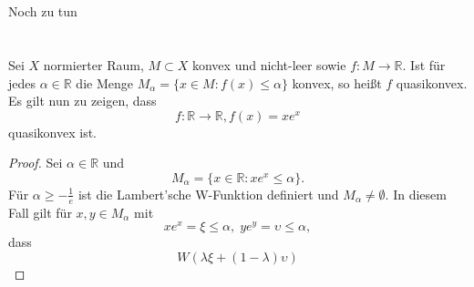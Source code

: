 \documentclass[a4paper]{article}
\begin{document}
\section{}
Noch zu tun

\section{}
Sei $X$ normierter Raum, $M\subset X$ konvex und nicht-leer sowie $f\colon M\to ℝ$. 
Ist für jedes  $α\in ℝ$ die Menge $M_α = \{ x\in M:f(x) \le α\}$ konvex, so heißt $f$ quasikonvex.
Es gilt nun zu zeigen, dass
$$f\colon ℝ\to ℝ, f(x) =xe^x$$
quasikonvex ist.

\begin{proof}
Sei $α\in ℝ$ und
$$M_α = \{x\in ℝ: xe^x \le α\}.$$
Für $α \ge -\frac{1}{e}$ ist die Lambert'sche W-Funktion definiert und $M_α \ne ∅$.
In diesem Fall gilt für $x,y\in M_α$ mit
$$xe^x = ξ \le α, \; ye^y = υ\le α,$$
dass
$$W(λξ + (1-λ) υ)$$
\end{proof}
\end{document}
